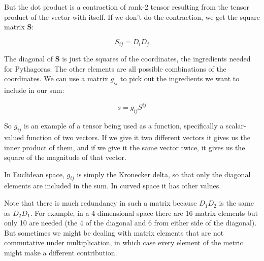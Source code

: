 But the dot product is a contraction of rank-2 tensor resulting from the tensor product of the vector with itself. If we don't do the contraction, we get the square matrix $\boldsymbol{S}$:

$$S_{ij} = D_iD_j$$

The diagonal of $\boldsymbol{S}$ is just the squares of the coordinates, the ingredients needed for Pythagoras. The other elements are all possible combinations of the coordinates. We can use a matrix $g_{ij}$ to pick out the ingredients we want to include in our sum:

$$s = g_{ij}S^{ij}$$

So $g_{ij}$ is an example of a tensor being used as a function, specifically a scalar-valued function of two vectors. If we give it two different vectors it gives us the inner product of them, and if we give it the same vector twice, it gives us the square of the magnitude of that vector.

In Euclidean space, $g_{ij}$ is simply the Kronecker delta, so that only the diagonal elements are included in the sum. In curved space it has other values.

Note that there is much redundancy in such a matrix because $D_1D_2$ is the same as $D_2D_1$. For example, in a 4-dimensional space there are 16 matrix elements but only 10 are needed (the 4 of the diagonal and 6 from either side of the diagonal). But sometimes we might be dealing with matrix elements that are not commutative under multiplication, in which case every element of the metric might make a different contribution.
